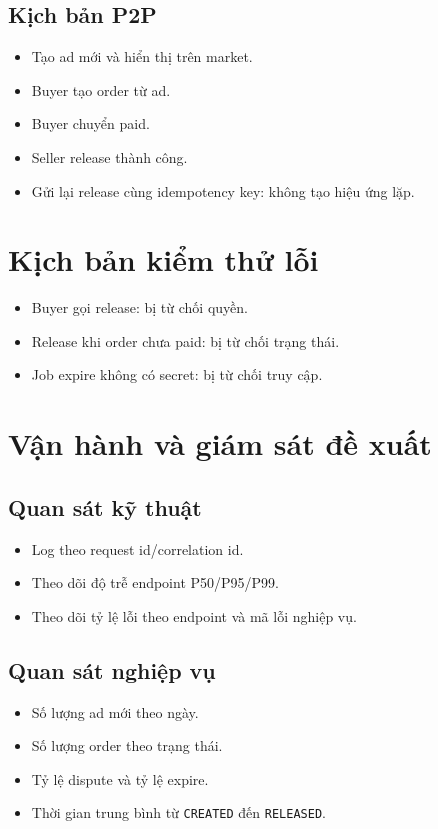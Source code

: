 \documentclass[a4paper,12pt]{report}
\begin{document}
\subsection{Kịch bản P2P}
\begin{itemize}
    \item Tạo ad mới và hiển thị trên market.
    \item Buyer tạo order từ ad.
    \item Buyer chuyển paid.
    \item Seller release thành công.
    \item Gửi lại release cùng idempotency key: không tạo hiệu ứng lặp.
\end{itemize}

\section{Kịch bản kiểm thử lỗi}
\begin{itemize}
    \item Buyer gọi release: bị từ chối quyền.
    \item Release khi order chưa paid: bị từ chối trạng thái.
    \item Job expire không có secret: bị từ chối truy cập.
\end{itemize}

\section{Vận hành và giám sát đề xuất}
\subsection{Quan sát kỹ thuật}
\begin{itemize}
    \item Log theo request id/correlation id.
    \item Theo dõi độ trễ endpoint P50/P95/P99.
    \item Theo dõi tỷ lệ lỗi theo endpoint và mã lỗi nghiệp vụ.
\end{itemize}

\subsection{Quan sát nghiệp vụ}
\begin{itemize}
    \item Số lượng ad mới theo ngày.
    \item Số lượng order theo trạng thái.
    \item Tỷ lệ dispute và tỷ lệ expire.
    \item Thời gian trung bình từ \texttt{CREATED} đến \texttt{RELEASED}.
\end{itemize}
\end{document}
